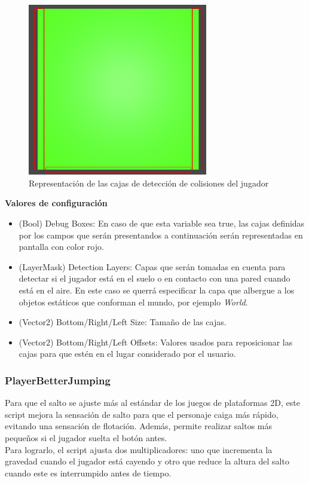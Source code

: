 \begin{figure}[t]
	\centering
	\includegraphics[width = 0.7\textwidth]{Imagenes/CollDetector.png}
	\caption{Representación de las cajas de detección de colisiones del jugador}
	\label{fig:Player_Coll_Detector}
\end{figure}

\textbf{Valores de configuración}
\begin{itemize}
	\item (Bool) Debug Boxes: En caso de que esta variable sea true, las cajas definidas por los campos que serán presentandos a continuación serán representadas en pantalla con color rojo.
	\item (LayerMask) Detection Layers: Capas que serán tomadas en cuenta para detectar si el jugador está en el suelo o en contacto con una pared cuando está en el aire. En este caso se querrá especificar la capa que albergue a los objetos estáticos que conforman el mundo, por ejemplo \textit{World}.
	\item (Vector2) Bottom/Right/Left Size: Tamaño de las cajas.
	\item (Vector2) Bottom/Right/Left Offsets: Valores usados para reposicionar las cajas para que estén en el lugar considerado por el usuario.
\end{itemize}
\subsubsection{PlayerBetterJumping}

Para que el salto se ajuste más al estándar de los juegos de plataformas 2D, este script mejora la sensación de salto para que el personaje caiga más rápido, evitando una sensación de flotación. Además, permite realizar saltos más pequeños si el jugador suelta el botón antes.\\
Para lograrlo, el script ajusta dos multiplicadores: uno que incrementa la gravedad cuando el jugador está cayendo y otro que reduce la altura del salto cuando este es interrumpido antes de tiempo.\\

